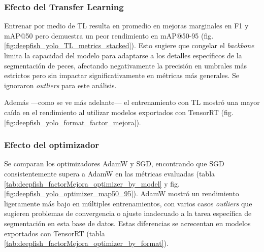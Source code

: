 \subsubsection{Efecto del Transfer Learning}
Entrenar por medio de TL resulta en promedio en mejoras marginales en F1 y mAP@50 pero demuestra un peor rendimiento en mAP@50-95 (fig. \ref{fig:deepfish_yolo_TL_metrics_stacked}). Esto sugiere que congelar el \textit{backbone} limita la capacidad del modelo para adaptarse a los detalles específicos de la segmentación de peces, afectando negativamente la precisión en umbrales más estrictos pero sin impactar significativamente en métricas más generales. Se ignoraron \textit{outliers} para este análisis.

Además ---como se ve más adelante--- el entrenamiento con TL mostró una mayor caída en el rendimiento al utilizar modelos exportados con TensorRT (fig. \ref{fig:deepfish_yolo_format_factor_mejora}).

\subsubsection{Efecto del optimizador}
Se comparan los optimizadores AdamW y SGD, encontrando que SGD consistentemente supera a AdamW en las métricas evaluadas (tabla \ref{tab:deepfish_factorMejora_optimizer_by_model} y fig. \ref{fig:deepfish_yolo_optimizer_map50_95}). AdamW mostró un rendimiento ligeramente más bajo en múltiples entrenamientos, con varios casos \textit{outliers} que sugieren problemas de convergencia o ajuste inadecuado a la tarea específica de segmentación en esta base de datos. Estas diferencias se acrecentan en modelos exportados con TensorRT (tabla \ref{tab:deepfish_factorMejora_optimizer_by_format}).

